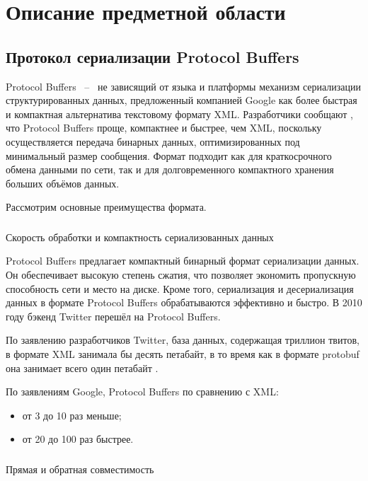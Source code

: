 \section{Описание предметной области}

\subsection{Протокол сериализации Protocol Buffers}

Protocol Buffers ~--~ не зависящий от языка и платформы механизм сериализации структурированных данных, предложенный компанией Google 
как более быстрая и компактная альтернатива текстовому формату XML. Разработчики сообщают \cite{protobuf_doc}, что Protocol Buffers проще, 
компактнее и быстрее, чем XML, поскольку осуществляется передача бинарных данных, оптимизированных под минимальный размер сообщения. 
Формат подходит как для краткосрочного обмена данными по сети, так и для долговременного компактного хранения больших объёмов данных.

Рассмотрим основные преимущества формата.

\subsubsection{} Скорость обработки и компактность сериализованных данных

Protocol Buffers предлагает компактный бинарный формат сериализации данных.
Он обеспечивает высокую степень сжатия, что позволяет экономить пропускную способность сети и место на диске. 
Кроме того, сериализация и десериализация данных в формате Protocol Buffers обрабатываются эффективно и быстро.
В 2010 году бэкенд Twitter перешёл на Protocol Buffers.

По заявлению разработчиков Twitter, база данных, содержащая триллион твитов, в формате XML занимала бы десять петабайт, в то время как в формате protobuf она занимает всего один петабайт \cite{protobuf_twitter}.

По заявлениям Google, Protocol Buffers по сравнению с XML:
\begin{itemize}
    \item от 3 до 10 раз меньше;
    \item от 20 до 100 раз быстрее.
\end{itemize}

\subsubsection{} Прямая и обратная совместимость

